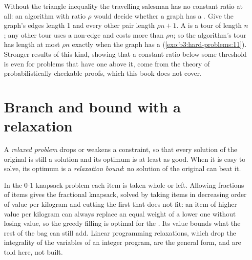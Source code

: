 Without the triangle inequality the travelling salesman has no constant ratio at all: an algorithm with ratio $\rho$ would decide whether a graph has a . Give the graph's edges length 1 and every other pair length $\rho n + 1$. A  is a tour of length $n$; any other tour uses a non-edge and costs more than $\rho n$; so the algorithm's tour has length at most $\rho n$ exactly when the graph has a  (\cref{exo:b3:hard-problems:11}).
Stronger results of this kind, showing that a constant ratio below some threshold is  even for problems that have one above it, come from the theory of probabilistically checkable proofs, which this book does not cover.

\section{Branch and bound with a relaxation}\label{sec:b3:hard-problems:bb}

\begin{definition}\label{def:b3:hard-problems:relaxation}
A \emph{relaxed problem} drops or weakens a constraint, so that every solution of the original is still a solution and its optimum is at least as good. When it is easy to solve, its optimum is a \emph{relaxation bound}: no solution of the original can beat it.
\end{definition}

In the 0-1 knapsack problem each item is taken whole or left. Allowing fractions of items gives the fractional knapsack, solved by taking items in decreasing order of value per kilogram and cutting the first that does not fit: an item of higher value per kilogram can always replace an equal weight of a lower one without losing value, so the greedy filling is optimal for the . Its value bounds what the rest of the bag can still add. Linear programming relaxations, which drop the integrality of the variables of an integer program, are the general form, and are told here, not built.

\label{lst:b3:hard-problems:knapsack}

